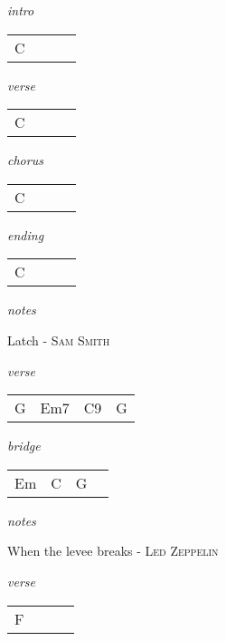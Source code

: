 \documentclass[12pt]{article}
\begin{document}
\huge
\textit{intro}

\begin{tabular}{|P{1.25in}|P{1.25in}|P{1.25in}|P{1.25in}|}
  C &   &   &   \\
\end{tabular}

\textit{verse}

\begin{tabular}{|P{1.25in}|P{1.25in}|P{1.25in}|P{1.25in}|}
  C &   &   &   \\
\end{tabular}

\textit{chorus}

\begin{tabular}{|P{1.25in}|P{1.25in}|P{1.25in}|P{1.25in}|}
  C &   &   &   \\
\end{tabular}

\textit{ending}

\begin{tabular}{|P{1.25in}|P{1.25in}|P{1.25in}|P{1.25in}|}
  C &   &   &   \\
\end{tabular}

\textit{notes}

\newpage

{\Huge Latch} {\huge - \textsc{Sam Smith}}

\huge
\textit{verse}

\begin{tabular}{|P{1.25in}|P{1.25in}|P{1.25in}|P{1.25in}|}
   G &  Em7 & C9  &  G \\
\end{tabular}

\textit{bridge}

\begin{tabular}{|P{1.25in}|P{1.25in}|P{1.25in}|P{1.25in}|}
   Em &  C &  G &   \\
\end{tabular}

\textit{notes}

\newpage

{\Huge When the levee breaks} {\huge - \textsc{Led Zeppelin}}

\huge
\textit{verse}

\begin{tabular}{|P{1.25in}|P{1.25in}|P{1.25in}|P{1.25in}|}
  F  &   &   &   \\
\end{tabular}
\end{document}
